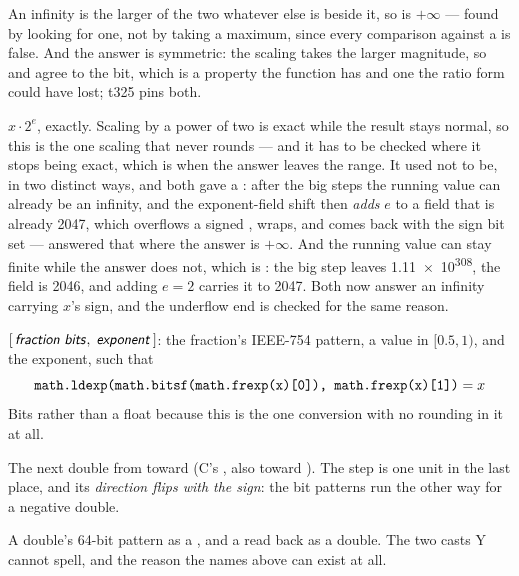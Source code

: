 \begin{description}[style=nextline,leftmargin=5.2em]
  An infinity is the larger of the two whatever else is beside it, so
   is $+\infty$ --- found by looking for one, not by taking
  a maximum, since every comparison against a  is false. And the answer
  is symmetric: the scaling takes the larger magnitude, so  and
   agree to the bit, which is a property the function has and
  one the ratio form could have lost; t325 pins both.
\item[\ic{math.ldexp(x, e)}] $x\cdot 2^e$, exactly. Scaling by a power of two
  is exact while the result stays normal, so this is the one scaling that never
  rounds --- and it has to be checked where it stops being exact, which is when
  the answer leaves the range. It used not to be, in two distinct ways, and both
  gave a : after the big steps the running value can already be an
  infinity, and the exponent-field shift then \emph{adds} $e$ to a field that is
  already \num{2047}, which overflows a signed , wraps, and comes back
  with the sign bit set ---  answered that where the answer
  is $+\infty$. And the running value can stay finite while the answer does not,
  which is : the big step leaves \num{1.11e308}, the field
  is \num{2046}, and adding $e=2$ carries it to \num{2047}. Both now answer an
  infinity carrying $x$'s sign, and the underflow end is checked for the same
  reason.
\item[\ic{math.frexp(x)}] $[\,\textsf{\textit{fraction\ bits}}, \;\textsf{\textit{exponent}}\,]$: the
  fraction's IEEE-754 pattern, a value in $[0.5, 1)$, and the exponent, such that
  \[\ic{math.ldexp(math.bitsf(math.frexp(x)[0]), math.frexp(x)[1])} = x\]
  \label{eq:frexp-ldexp}
  Bits rather than a float because this is the one conversion with no rounding
  in it at all.
\item[\ic{math.nextafter(x, y)}] The next double from  toward  (C's
  , also  toward ). The step is one unit in
  the last place, and its \emph{direction flips with the sign}: the bit patterns
  run the other way for a negative double.
\item[\ic{math.fbits(x)}, \ic{math.bitsf(b)}] A double's 64-bit pattern as a
  , and a  read back as a double. The two casts Y cannot
  spell, and the reason the names above can exist at all.

\end{description}
